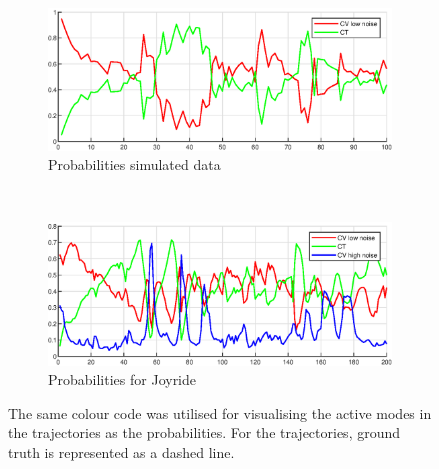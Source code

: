 \begin{figure}[ht]
\begin{subfigure}[h]{0.4\textwidth}
        \label{fig:ga_1_joyride_error}
    \end{subfigure}
        \\
    \begin{subfigure}[h]{0.4\textwidth}
        \includegraphics[width=\textwidth]{figures/ga_1/2_probs}
        \caption{Probabilities simulated data}
        \label{fig:ga_1_2_error}
    \end{subfigure}%
    ~
    \begin{subfigure}[h]{0.4\textwidth}
        \includegraphics[width=\textwidth]{figures/ga_1/joyride_probs}
        \caption{Probabilities for Joyride}
        \label{fig:ga_1_joyride_error}
    \end{subfigure}
    \caption{The same colour code was utilised for visualising the active modes in the trajectories as the probabilities. For the trajectories, ground truth is represented as a dashed line. }
    \label{fig:ga_1} 
\end{figure}

